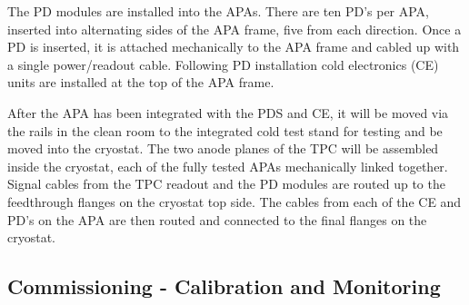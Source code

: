 The PD modules are installed into the APAs. There are ten PD's per APA, inserted into alternating sides of the APA frame, five from each direction. Once a PD is inserted, it is attached mechanically to the APA frame  and cabled up with a single power/readout cable. Following PD installation cold electronics (CE) units are installed at the top of the APA frame.

After the APA has been integrated with the PDS and CE, it will be moved via the rails in the clean room to the integrated cold test stand for testing and be moved into the cryostat. The two anode planes of the TPC will be assembled inside the cryostat, each of the fully tested APAs mechanically linked together. Signal cables from the TPC readout and the PD modules are routed up to the feedthrough flanges on the cryostat top side. The cables from each of the CE and PD's on the APA are then routed and connected to the final flanges on the cryostat.


\subsection{Commissioning - Calibration and Monitoring}
\label{sec:fdsp-pd-install-calib}



